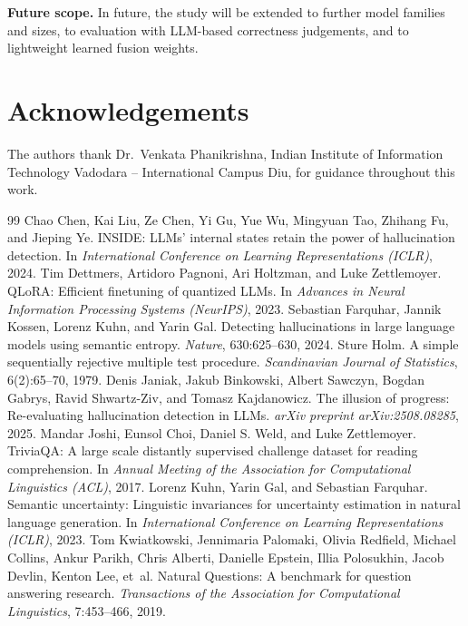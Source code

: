\documentclass[10pt]{article}
\begin{document}
\textbf{Future scope.} In future, the study will be extended to further model families and sizes, to evaluation with LLM-based correctness judgements, and to lightweight learned fusion weights.

\section*{Acknowledgements}
The authors thank Dr.~Venkata Phanikrishna, Indian Institute of Information Technology Vadodara -- International Campus Diu, for guidance throughout this work.

\begin{thebibliography}{99}
\setlength{\itemsep}{2pt}\small
{} Chao Chen, Kai Liu, Ze Chen, Yi Gu, Yue Wu, Mingyuan Tao, Zhihang Fu, and Jieping Ye. INSIDE: LLMs' internal states retain the power of hallucination detection. In \emph{International Conference on Learning Representations (ICLR)}, 2024.
 Tim Dettmers, Artidoro Pagnoni, Ari Holtzman, and Luke Zettlemoyer. QLoRA: Efficient finetuning of quantized LLMs. In \emph{Advances in Neural Information Processing Systems (NeurIPS)}, 2023.
 Sebastian Farquhar, Jannik Kossen, Lorenz Kuhn, and Yarin Gal. Detecting hallucinations in large language models using semantic entropy. \emph{Nature}, 630:625--630, 2024.
 Sture Holm. A simple sequentially rejective multiple test procedure. \emph{Scandinavian Journal of Statistics}, 6(2):65--70, 1979.
 Denis Janiak, Jakub Binkowski, Albert Sawczyn, Bogdan Gabrys, Ravid Shwartz-Ziv, and Tomasz Kajdanowicz. The illusion of progress: Re-evaluating hallucination detection in LLMs. \emph{arXiv preprint arXiv:2508.08285}, 2025.
 Mandar Joshi, Eunsol Choi, Daniel S. Weld, and Luke Zettlemoyer. TriviaQA: A large scale distantly supervised challenge dataset for reading comprehension. In \emph{Annual Meeting of the Association for Computational Linguistics (ACL)}, 2017.
 Lorenz Kuhn, Yarin Gal, and Sebastian Farquhar. Semantic uncertainty: Linguistic invariances for uncertainty estimation in natural language generation. In \emph{International Conference on Learning Representations (ICLR)}, 2023.
 Tom Kwiatkowski, Jennimaria Palomaki, Olivia Redfield, Michael Collins, Ankur Parikh, Chris Alberti, Danielle Epstein, Illia Polosukhin, Jacob Devlin, Kenton Lee, et~al. Natural Questions: A benchmark for question answering research. \emph{Transactions of the Association for Computational Linguistics}, 7:453--466, 2019.

\end{thebibliography}
\end{document}
